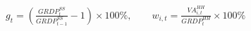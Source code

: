 \documentclass[border=4pt]{standalone}
\begin{document}
\begin{minipage}{16cm}
\centering
\Large $\displaystyle g_t=\left(\frac{GRDP_t^{SS}}{GRDP_{t-1}^{SS}}-1\right)\times100\%,\qquad w_{i,t}=\frac{VA_{i,t}^{HH}}{GRDP_t^{HH}}\times100\%$
\end{minipage}
\end{document}
